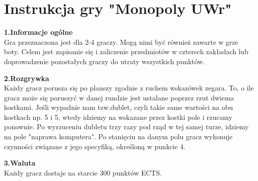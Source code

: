 \documentclass[a4paper]{article}
\author{}
\title{}
\date{\today}
\begin{document}
\section*{Instrukcja gry "Monopoly UWr"}

\noindent \textbf{1.Informacje ogólne}\\
\noindent Gra przeznaczona jest dla 2-4 graczy. Mogą nimi być również zawarte w grze boty. Celem jest zapisanie się i zaliczenie przedmiotów w czterech zakładach lub doprowadzenie pozostałych graczy do utraty wszystkich punktów.
\vspace{10pt}

\noindent \textbf{2.Rozgrywka}\\
\noindent Każdy gracz porusza się po planszy zgodnie z ruchem wskazówek zegara. To, o ile gracz może się poruszyć w danej rundzie jest ustalane poprzez rzut dwiema kostkami. Jeśli wypadnie nam tzw.dublet, czyli takie same wartości na obu kostkach np. 5 i 5, wtedy idziemy na wskazane przez kostki pole i rzucamy ponownie. Po wyrzuceniu dubletu trzy razy pod rząd w tej samej turze, idziemy na pole "naprawa komputera". Po stanięciu na danym polu gracz wykonuje czynności związane z jego specyfiką, określoną w punkcie 4.
\vspace{10pt}

\noindent \textbf{3.Waluta}\\
\noindent Każdy gracz dostaje na starcie 300 punktów ECTS.
\vspace{10pt}
\end{document}
